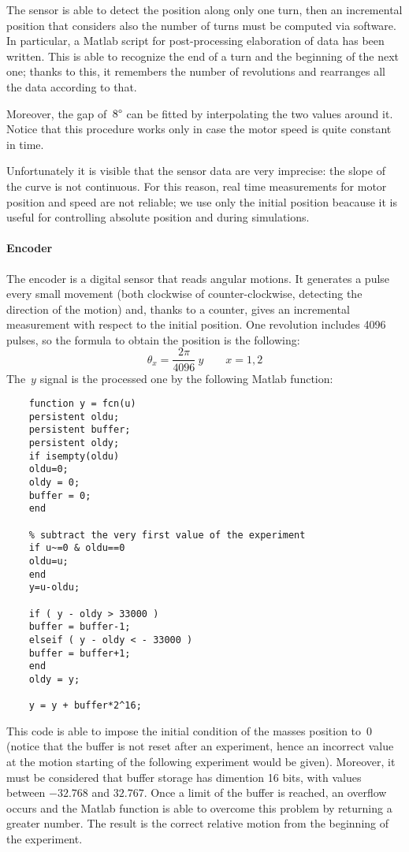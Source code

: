 The sensor is able to detect the position along only one turn, then an incremental position that considers also the number of turns must be computed via software.
In particular, a Matlab script for post-processing elaboration of data has been written. This is able to recognize the end of a turn and the beginning of the next one; thanks to this, it remembers the number of revolutions and rearranges all the data according to that.

Moreover, the gap of~$8 \degree$ can be fitted by interpolating the two values around it. Notice that this procedure works only in case the motor speed is quite constant in time.

Unfortunately it is visible that the sensor data are very imprecise: the slope of the curve is not continuous. For this reason, real time measurements for motor position and speed are not reliable; we use only the initial position beacause it is useful for controlling absolute position and  during simulations.

\paragraph{Encoder}

The encoder is a digital sensor that reads angular motions. It generates a pulse every small movement (both clockwise of counter-clockwise, detecting the direction of the motion) and, thanks to a counter, gives an incremental measurement with respect to the initial position. One revolution includes 4096 pulses, so the formula to obtain the position is the following:
\[
	\theta_x = \frac{2\pi}{4096} \ y \qquad x={1,2}
\]
The~$y$ signal is the processed one by the following Matlab function:
\begin{verbatim}
	function y = fcn(u)
	persistent oldu;
	persistent buffer;
	persistent oldy;
	if isempty(oldu)
	oldu=0;
	oldy = 0;
	buffer = 0;
	end
	
	% subtract the very first value of the experiment
	if u~=0 & oldu==0 
	oldu=u;
	end
	y=u-oldu;
	
	if ( y - oldy > 33000 )
	buffer = buffer-1;
	elseif ( y - oldy < - 33000 )
	buffer = buffer+1;
	end
	oldy = y;
	
	y = y + buffer*2^16;
\end{verbatim}
This code is able to impose the initial condition of the masses position to~$0$ (notice that the buffer is not reset after an experiment, hence an incorrect value at the motion starting of the following experiment would be given). Moreover, it must be considered that buffer storage has dimention 16 bits, with values between $-32.768$ and $32.767$. Once a limit of the buffer is reached, an overflow occurs and the Matlab function is able to overcome this problem by returning a greater number. The result is the correct relative motion from the beginning of the experiment.

